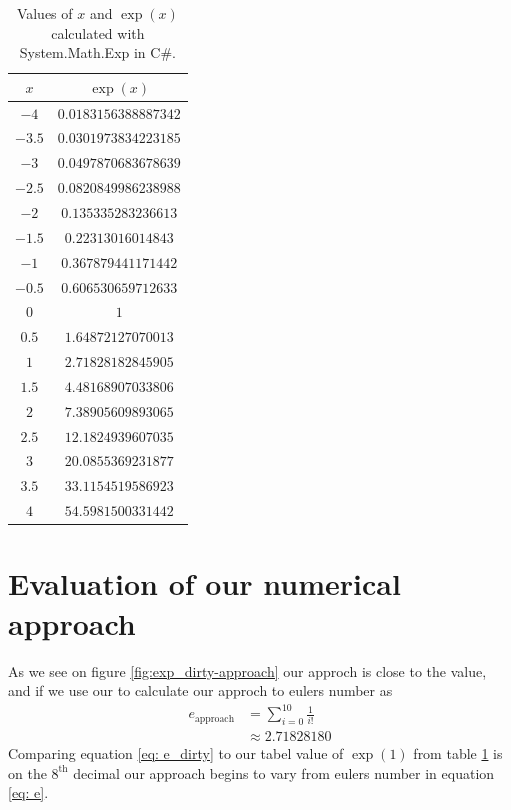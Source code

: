 \documentclass[12pt, twocolumn, a4paper]{article}
\begin{document}
\begin{table}
	\begin{center}
		\caption{Values of $x$ and $\exp \left( x \right)$ calculated with System.Math.Exp in C\#.}
	    \begin{tabular}{| c | c |}
	    \hline
	    $x$ & $\exp \left(x\right)$ \\ \hline
	    $-4$ & $0.0183156388887342$ \\
		\hline
		$-3.5$ & $0.0301973834223185$\\
		\hline
		$-3$ & $ 0.0497870683678639$ \\ 
		\hline
		$-2.5$ & $ 0.0820849986238988$ \\ 
		\hline
		$-2$ & $ 0.135335283236613$ \\ 
		\hline
		$-1.5$ & $ 0.22313016014843$ \\ 
		\hline
		$-1$ & $ 0.367879441171442$ \\ 
		\hline
		$-0.5$ & $ 0.606530659712633$ \\ 
		\hline
		$0$ & $ 1$ \\ 
		\hline
		$0.5$ & $ 1.64872127070013$ \\ 
		\hline
		$1$ & $ 2.71828182845905$ \\ 
		\hline
		$1.5$ & $ 4.48168907033806$ \\ 
		\hline
		$2$ & $ 7.38905609893065$ \\ 
		\hline
		$2.5$ & $ 12.1824939607035$ \\ 
		\hline
		$3$ & $ 20.0855369231877$ \\ 
		\hline
		$3.5$ & $ 33.1154519586923$ \\ 
		\hline
		$4$ & $ 54.5981500331442$ \\
		\hline
	    \end{tabular}
	\label{tab_exp}
	\end{center}
\end{table}
\section{Evaluation of our numerical approach}
As we see on figure \ref{fig:exp_dirty-approach} our approch is close to the value, and if we use our to calculate our approch to eulers number as
\begin{align}
e_{\text{approach}} &= \sum_{i=0}^{10} \frac{1}{i!} \nonumber\\
&\approx 2.71828180 \label{eq: e_dirty}
\end{align}
Comparing equation \eqref{eq: e_dirty} to our tabel value of $\exp\left(1\right)$ from table \ref{tab_exp} is on the $8^{\text{th}}$ decimal our approach begins to vary from eulers number in equation \eqref{eq: e}.
\end{document}
